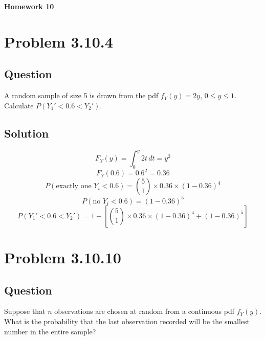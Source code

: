 \documentclass[12pt]{article}
\begin{document}
\begin{center}
  \Large \textbf{Homework 10}
\end{center}

\section*{Problem 3.10.4}
\subsection*{Question}
A random sample of size 5 is drawn from the pdf \( f_Y(y) = 2y \), \( 0 \leq y \leq 1 \). Calculate \( P(Y_1' < 0.6 < Y_2') \).

\subsection*{Solution}
\[
F_Y(y) = \int_0^y 2t \, dt = y^2
\]
\[
F_Y(0.6) = 0.6^2 = 0.36
\]
\[
P(\text{exactly one } Y_i < 0.6) = \binom{5}{1} \times 0.36 \times (1-0.36)^4
\]
\[
P(\text{no } Y_i < 0.6) = (1-0.36)^5
\]
\[
P(Y_1' < 0.6 < Y_2') = 1 - \left[ \binom{5}{1} \times 0.36 \times (1-0.36)^4 + (1-0.36)^5 \right]
\]
\pagebreak

\section*{Problem 3.10.10}
\subsection*{Question}
Suppose that \( n \) observations are chosen at random from a continuous pdf \( f_Y(y) \). What is the probability that the last observation recorded will be the smallest number in the entire sample?
\end{document}
